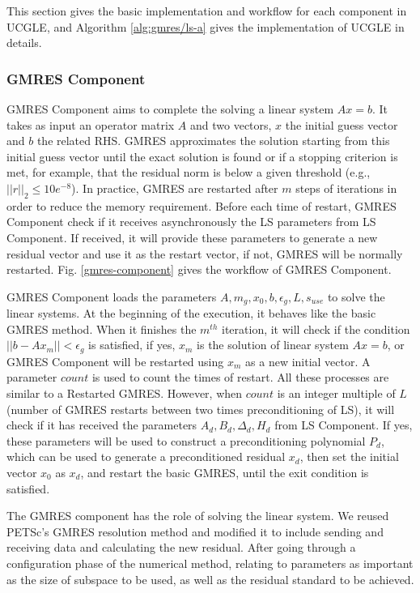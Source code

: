This section gives the basic implementation and workflow for each component in UCGLE, and Algorithm \ref{alg:gmres/ls-a} gives the implementation of UCGLE in details.

\subsubsection{GMRES Component}

GMRES Component aims to complete the solving a linear system $Ax=b$. It takes as input an operator matrix $A$ and two vectors, $x$ the initial guess vector and $b$ the related RHS. GMRES approximates the solution starting from this initial guess vector until the exact solution is found or if a stopping criterion is met, for example, that the residual norm is below a given threshold (e.g., $||r||_2 \leq 10e^{-8}$). In practice, GMRES are restarted after $m$ steps of iterations in order to reduce the memory requirement. Before each time of restart, GMRES Component check if it receives asynchronously the LS parameters from LS Component. If received, it will provide these parameters to generate a new residual vector and use it as the restart vector, if not, GMRES will be normally restarted. Fig. \ref{gmres-component} gives the workflow of GMRES Component.

GMRES Component loads the parameters $A, m_g, x_0, b, \epsilon_g, L, s_{use}$ to solve the linear systems. At the beginning of the execution, it behaves like the basic GMRES method. When it finishes the $m^{th}$ iteration, it will check if the condition $||b-Ax_m||<\epsilon_g$ is satisfied, if yes, $x_m$ is the solution of linear system $Ax=b$, or GMRES Component will be restarted using $x_m$ as a new initial vector. A parameter $count$ is used to count the times of restart. All these processes are similar to a Restarted GMRES. However, when $count$ is an integer multiple of $L$ (number of GMRES restarts between two times preconditioning of LS), it will check if it has received the parameters $A_d, B_d, \Delta_d, H_d$ from LS Component. If yes, these parameters will be used to construct a preconditioning polynomial $P_d$, which can be used to generate a preconditioned residual $x_d$, then set the initial vector $x_0$ as $x_d$, and restart the basic GMRES, until the exit condition is satisfied.

The GMRES component has the role of solving the linear system.  We reused PETSc's GMRES resolution method and modified it to include sending and receiving data and calculating the new residual. After going through a configuration phase of the numerical method, relating to parameters as important as the size of subspace to be used, as well as the residual standard to be achieved.

